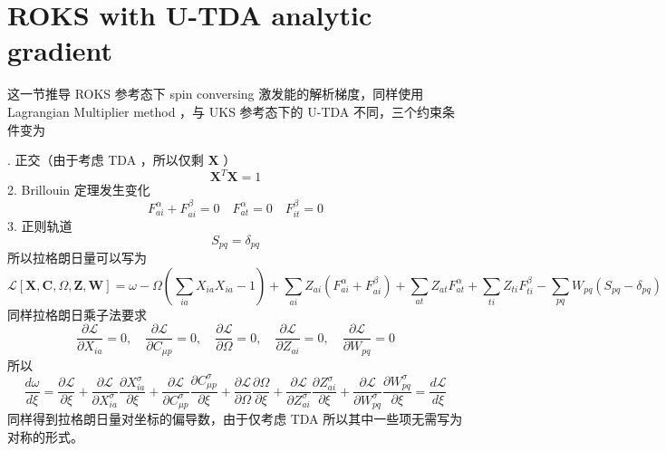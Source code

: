 \documentclass[11pt]{ctexart}
\numberwithin{equation}{section}
\begin{document}
\section{ROKS with U-TDA analytic gradient}
这一节推导 ROKS 参考态下 spin conversing 激发能的解析梯度，同样使用 Lagrangian Multiplier method ，与 UKS 参考态下的 U-TDA 不同，三个约束条件变为

. 正交（由于考虑 TDA ，所以仅剩 $\mathbf{X}$ ）
\begin{equation}
    \mathbf{X}^{T}\mathbf{X} = 1
\end{equation}
2. Brillouin 定理发生变化
\begin{equation}
    F_{ai}^{\alpha}+F_{ai}^{\beta} = 0
    \quad F_{at}^{\alpha} = 0
    \quad F_{it}^{\beta} = 0
\end{equation}
3. 正则轨道
\begin{equation}
    S_{pq} = \delta_{pq}
\end{equation}
所以拉格朗日量可以写为
\begin{equation}
    \mathcal{L}[\mathbf{X},\mathbf{C},\Omega,\mathbf{Z},\mathbf{W}]
    = \omega 
    - \Omega(\sum_{ia}X_{ia}X_{ia}-1)
    + \sum_{ai}Z_{ai}(F_{ai}^{\alpha}+F_{ai}^{\beta})
    + \sum_{at}Z_{at}F_{at}^{\alpha}
    + \sum_{ti}Z_{ti}F_{ti}^{\beta}
    - \sum_{pq}W_{pq}(S_{pq}-\delta_{pq})
\end{equation}
同样拉格朗日乘子法要求
\begin{equation}
    \frac{\partial \mathcal{L}}{\partial X_{ia}} = 0,
    \quad \frac{\partial \mathcal{L}}{\partial C_{\mu p}} = 0,
    \quad \frac{\partial \mathcal{L}}{\partial \Omega} = 0 ,
    \quad \frac{\partial \mathcal{L}}{\partial Z_{ai}} = 0 ,
    \quad \frac{\partial \mathcal{L}}{\partial W_{pq}} = 0 
\end{equation}
所以
\begin{equation}
    \frac{d \omega}{d \xi} 
    = \frac{\partial\mathcal{L}}{\partial \xi}
    + \frac{\partial\mathcal{L}}{\partial X_{ia}^{\sigma}}\frac{\partial X_{ia}^{\sigma}}{\partial \xi}
    + \frac{\partial\mathcal{L}}{\partial C_{\mu p}^{\sigma}}\frac{\partial C_{\mu p}^{\sigma}}{\partial \xi}
    + \frac{\partial\mathcal{L}}{\partial \Omega}\frac{\partial \Omega}{\partial \xi}
    + \frac{\partial\mathcal{L}}{\partial Z_{ai}^{\sigma}}\frac{\partial Z_{ai}^{\sigma}}{\partial \xi}
    + \frac{\partial\mathcal{L}}{\partial W_{pq}^{\sigma}}\frac{\partial W_{pq}^{\sigma}}{\partial \xi}
    = \frac{d \mathcal{L}}{d\xi}
\end{equation}
同样得到拉格朗日量对坐标的偏导数，由于仅考虑 TDA 所以其中一些项无需写为对称的形式。
\end{document}
